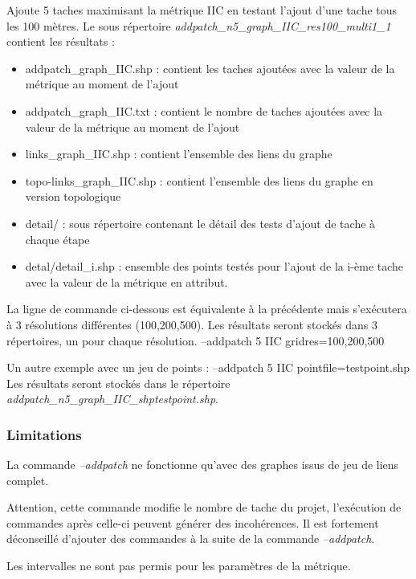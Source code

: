 \documentclass[a4paper,10pt]{report}
\newenvironment{cmd}
{\quote\Verbatim}
{\endVerbatim\endquote}
\begin{document}
Ajoute 5 taches maximisant la métrique IIC en testant l'ajout d'une tache tous les 100 mètres.
Le sous répertoire \textit{addpatch\_n5\_graph\_IIC\_res100\_multi1\_1} contient les résultats :
\begin{itemize}
 \item addpatch\_graph\_IIC.shp : contient les taches ajoutées avec la valeur de la métrique au moment de l'ajout
 \item addpatch\_graph\_IIC.txt : contient le nombre de taches ajoutées avec la valeur de la métrique au moment de l'ajout
 \item links\_graph\_IIC.shp : contient l'ensemble des liens du graphe
 \item topo-links\_graph\_IIC.shp : contient l'ensemble des liens du graphe en version topologique
 \item detail/ : sous répertoire contenant le détail des tests d'ajout de tache à chaque étape
 \item detal/detail\_i.shp : ensemble des points testés pour l'ajout de la i-ème tache avec la valeur de la métrique en attribut.
\end{itemize}


La ligne de commande ci-dessous est équivalente à la précédente mais s'exécutera à 3 résolutions différentes (100,200,500). Les résultats seront stockés dans 3 répertoires, un pour chaque résolution.
\begin{cmd}
--addpatch 5 IIC gridres=100,200,500
\end{cmd}

Un autre exemple avec un jeu de points :
\begin{cmd}
--addpatch 5 IIC pointfile=testpoint.shp
\end{cmd}
Les résultats seront stockés dans le répertoire \textit{addpatch\_n5\_graph\_IIC\_shptestpoint.shp}.

\subsubsection{Limitations}
La commande \textit{--addpatch} ne fonctionne qu'avec des graphes issus de jeu de liens complet. 

Attention, cette commande modifie le nombre de tache du projet, l'exécution de commandes après celle-ci peuvent générer des incohérences.
Il est fortement déconseillé d'ajouter des commandes à la suite de la commande \textit{--addpatch}.

Les intervalles ne sont pas permis pour les paramètres de la métrique.
\end{document}
